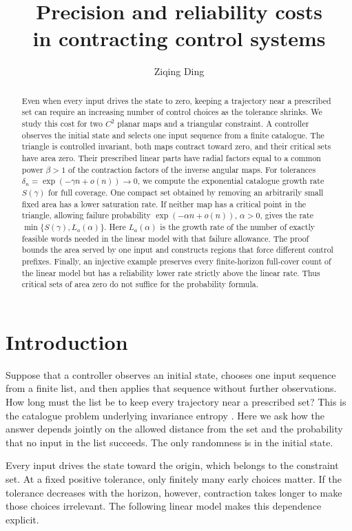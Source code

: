 \documentclass[11pt]{amsart}
\title[Precision and reliability costs]{Precision and reliability costs\\in contracting control systems}
\author{Ziqing Ding}
\date{}
\theoremstyle{definition}
\theoremstyle{remark}
\numberwithin{equation}{section}
\begin{document}
\raggedbottom
\begin{abstract}
Even when every input drives the state to zero, keeping a trajectory
near a prescribed set can require an increasing number of control
choices as the tolerance shrinks. We study this cost for two $C^2$
planar maps and a triangular constraint. A controller observes the
initial state and selects one input sequence from a finite catalogue.
The triangle is controlled invariant, both maps contract toward zero,
and their critical sets have area zero. Their prescribed linear parts
have radial factors equal to a common power $\beta>1$ of the
contraction factors of the inverse angular maps.
For tolerances $\delta_n=\exp(-\gamma n+o(n))\to0$, we compute
the exponential catalogue growth rate $S(\gamma)$ for full coverage.
One compact set obtained by removing an arbitrarily small fixed area
has a lower saturation rate. If neither map has a critical point in
the triangle, allowing failure probability $\exp(-\alpha n+o(n))$,
$\alpha>0$, gives the rate $\min\{S(\gamma),L_a(\alpha)\}$.
Here $L_a(\alpha)$ is the growth rate of the number of exactly
feasible words needed in the linear model with that failure allowance.
The proof bounds the area served by one
input and constructs regions that force different control prefixes.
Finally, an injective example preserves every finite-horizon
full-cover count of the linear model but has a reliability lower
rate strictly above the linear rate. Thus critical sets of area zero do not
suffice for the probability formula.
\end{abstract}
\maketitle

\section{Introduction}
Suppose that a controller observes an initial state, chooses one
input sequence from a finite list, and then applies that sequence
without further observations. How long must the list be to keep
every trajectory near a prescribed set? This is the catalogue
problem underlying invariance entropy \cite{CK2009,Kawan2013}.
Here we ask how the answer depends jointly on the allowed distance
from the set and the probability that no input in the list succeeds.
The only randomness is in the initial state.

Every input drives the state toward the origin, which belongs to
the constraint set.
At a fixed positive tolerance, only finitely many early choices
matter. If the tolerance decreases with the horizon, however,
contraction takes longer to make those choices irrelevant.
The following linear model makes this dependence explicit.
\end{document}
